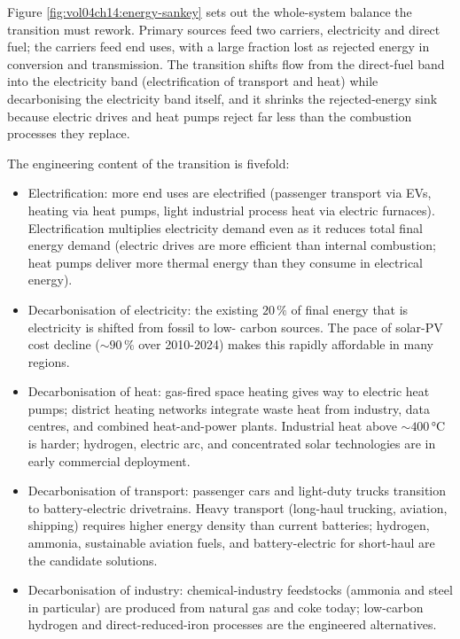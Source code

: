 Figure \ref{fig:vol04ch14:energy-sankey} sets out the whole-system
balance the transition must rework. Primary sources feed two carriers,
electricity and direct fuel; the carriers feed end uses, with a large
fraction lost as rejected energy in conversion and transmission. The
transition shifts flow from the direct-fuel band into the electricity
band (electrification of transport and heat) while decarbonising the
electricity band itself, and it shrinks the rejected-energy sink
because electric drives and heat pumps reject far less than the
combustion processes they replace.

The engineering content of the transition is fivefold:
\begin{itemize}[leftmargin=*]
  \item Electrification: more end uses are electrified (passenger
    transport via EVs, heating via heat pumps, light industrial
    process heat via electric furnaces). Electrification multiplies
    electricity demand even as it reduces total final energy demand
    (electric drives are more efficient than internal combustion;
    heat pumps deliver more thermal energy than they consume in
    electrical energy).
  \item Decarbonisation of electricity: the existing $20\,\%$ of
    final energy that is electricity is shifted from fossil to low-
    carbon sources. The pace of solar-PV cost decline ($\sim 90\,\%$
    over 2010-2024) makes this rapidly affordable in many regions.
  \item Decarbonisation of heat: gas-fired space heating gives way to
    electric heat pumps; district heating networks integrate waste
    heat from industry, data centres, and combined heat-and-power
    plants. Industrial heat above $\sim 400\,\si{\celsius}$ is
    harder; hydrogen, electric arc, and concentrated solar
    technologies are in early commercial deployment.
  \item Decarbonisation of transport: passenger cars and light-duty
    trucks transition to battery-electric drivetrains. Heavy
    transport (long-haul trucking, aviation, shipping) requires
    higher energy density than current batteries; hydrogen, ammonia,
    sustainable aviation fuels, and battery-electric for short-haul
    are the candidate solutions.
  \item Decarbonisation of industry: chemical-industry feedstocks
    (ammonia and steel in particular) are produced from natural gas and
    coke today; low-carbon hydrogen and direct-reduced-iron processes
    are the engineered alternatives.
\end{itemize}

